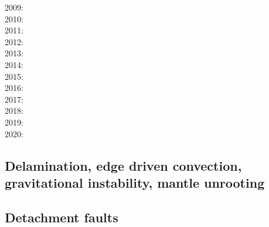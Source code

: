 {2009: \cite{bupb09}\cite{plmg09}\cite{rigo09}\cite{bubg09}\cite{coco09}\\
2010: \cite{hamo10}\cite{fasm10}\cite{grpy10}\cite{vago10}\cite{plmf10}\cite{spgs10a}\cite{pygp10}
      \cite{jabw10}\\
2011: \cite{rera11}\cite{chss11}\\
2012: \cite{wagw12}\cite{vacl12}\cite{buit12}\cite{kogp12}\cite{gohg12}\cite{trub12}\\
2013: \cite{wazh13}\cite{krcu13}\cite{frbm13}\cite{wagw13}\cite{duyp13}\cite{rugb13}
      \cite{scdg13}\\
2014: \cite{kava14}\cite{dusp14}\cite{wavp14}\cite{whbb14}\cite{scml14}
      \cite{mals14}\cite{gupm14}\cite{gahs14}\cite{mutg14}\\
2015: \cite{wavp15}\cite{thkp15}\cite{mags15}\cite{duys15}\cite{dusp15}\\
2016: \cite{wahz16}\\
2017: \cite{rugb17}\cite{ozgw17}\cite{vomc17}\cite{taac17}\cite{ithc17}\\
2018: \cite{wavp18}\cite{nigw18}\cite{bemc18}\cite{neew18}\\
2019: \cite{koen19}\cite{kipd19}\cite{crcm19}\cite{pedm19}\cite{mazz19}\cite{chch19}\\
2020: \cite{yamq20}
}

\subsection{Delamination, edge driven convection, gravitational instability, mantle unrooting} 

{\scriptsize
\noindent
\cite{kian95}
\cite{homo97}
\cite{kian98}\cite{scsc98}\cite{mafs98}
\cite{kiri00}\cite{scys00}
\cite{modo04}
\cite{elki07}
\cite{gopy08}\cite{vavg08}
\cite{vabv10}
\cite{lesm11}
\cite{krcu13}\cite{sths13}
\cite{baeg14}\cite{kava14}
\cite{wahz15}
\cite{bems17}
\cite{peka18}
}

\subsection{Detachment faults} 

